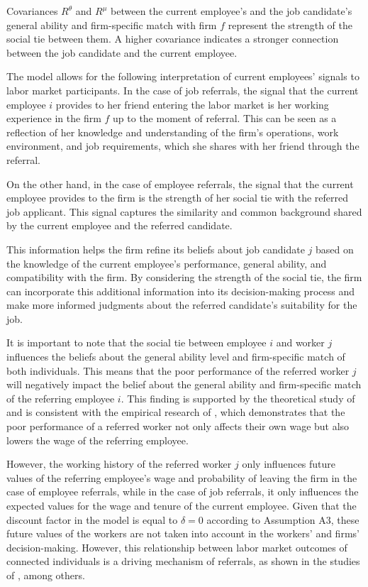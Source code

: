 \documentclass[12pt]{article}
\begin{document}
Covariances $R^\theta$ and $R^\mu$ between the current employee's and the job candidate's general ability and firm-specific match with firm $f$ represent the strength of the social tie between them. A higher covariance indicates a stronger connection between the job candidate and the current employee.

The model allows for the following interpretation of current employees' signals to labor market participants. In the case of job referrals, the signal that the current employee $i$ provides to her friend entering the labor market is her working experience in the firm $f$ up to the moment of referral. This can be seen as a reflection of her knowledge and understanding of the firm's operations, work environment, and job requirements, which she shares with her friend through the referral.

On the other hand, in the case of employee referrals, the signal that the current employee provides to the firm is the strength of her social tie with the referred job applicant. This signal captures the similarity and common background shared by the current employee and the referred candidate.

This information helps the firm refine its beliefs about job candidate $j$ based on the knowledge of the current employee's performance, general ability, and compatibility with the firm. By considering the strength of the social tie, the firm can incorporate this additional information into its decision-making process and make more informed judgments about the referred candidate's suitability for the job.

It is important to note that the social tie between employee $i$ and worker $j$ influences the beliefs about the general ability level and firm-specific match of both individuals. This means that the poor performance of the referred worker $j$ will negatively impact the belief about the general ability and firm-specific match of the referring employee $i$. This finding is supported by the theoretical study of \cite{ekinci2016employee} and is consistent with the empirical research of \cite{heath2018firms}, which demonstrates that the poor performance of a referred worker not only affects their own wage but also lowers the wage of the referring employee.

However, the working history of the referred worker $j$ only influences future values of the referring employee's wage and probability of leaving the firm in the case of employee referrals, while in the case of job referrals, it only influences the expected values for the wage and tenure of the current employee. Given that the discount factor in the model is equal to $\delta = 0$ according to Assumption A3, these future values of the workers are not taken into account in the workers' and firms' decision-making. However, this relationship between labor market outcomes of connected individuals is a driving mechanism of referrals, as shown in the studies of \cite{montgomery1991social, beaman2012gets, ekinci2016employee, heath2018firms, friebel2023employee}, among others.
\end{document}
